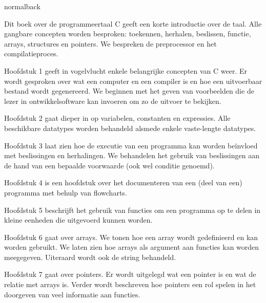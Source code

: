 \documentclass[spinewidth=10.44mm]{bookcover}
\begin{document}
\begin{bookcover}
\begin{bookcoverelement}{normal}{back}
\centering
\vfill
\parbox{110mm}{%
Dit boek over de programmeertaal C geeft een korte introductie over de taal. Alle gangbare concepten worden besproken: toekennen, herhalen, beslissen, functie, arrays, structures en pointers. We bespreken de preprocessor en het compilatieproces.

Hoofdstuk 1 geeft in vogelvlucht enkele belangrijke concepten van  C weer. Er wordt gesproken over wat een computer en een compiler is en hoe een uitvoerbaar bestand wordt gegenereerd. We beginnen met het geven van voorbeelden die de lezer in ontwikkelsoftware kan invoeren om zo de uitvoer te bekijken.

Hoofdstuk 2 gaat dieper in op variabelen, constanten en expressies. Alle beschikbare datatypes worden behandeld alsmede enkele vaste-lengte datatypes.

Hoofdstuk 3 laat zien hoe de executie van een programma kan worden beïnvloed met beslissingen en herhalingen. We behandelen het gebruik van beslissingen aan de hand van een bepaalde voorwaarde (ook wel conditie genoemd).

Hoofdstuk 4 is een hoofdstuk over het documenteren van een (deel van een) programma met behulp van flowcharts.

Hoofdstuk 5 beschrijft het gebruik van functies om een programma op te delen in kleine eenheden die uitgevoerd kunnen worden.

Hoofdstuk 6 gaat over arrays. We tonen hoe een array wordt gedefinieerd en kan worden gebruikt. We laten zien hoe arrays als argument aan functies kan worden meegegeven. Uiteraard wordt ook de string behandeld.

Hoofdstuk 7 gaat over pointers. Er wordt uitgelegd wat een pointer is en wat de relatie met arrays is. Verder wordt beschreven hoe pointers een rol spelen in het doorgeven van veel informatie aan functies.

}
\end{bookcoverelement}
\end{bookcover}
\end{document}
